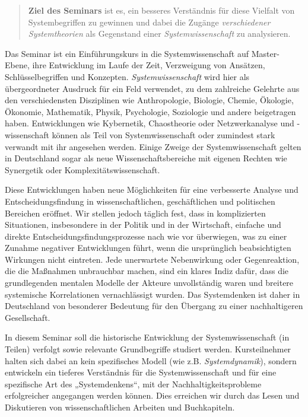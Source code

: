 \documentclass[11pt,a4paper]{article}
\begin{document}
\begin{quote}
  \textbf{Ziel des Seminars} ist es, ein besseres Verständnis für diese
  Vielfalt von Systembegriffen zu gewinnen und dabei die Zugänge
  \emph{verschiedener Systemtheorien} als Gegenstand einer
  \emph{Systemwissenschaft} zu analysieren.
\end{quote}
Das Seminar ist ein Einführungskurs in die Systemwissenschaft auf
Master-Ebene, ihre Entwicklung im Laufe der Zeit, Verzweigung von Ansätzen,
Schlüsselbegriffen und Konzepten.  \emph{Systemwissenschaft} wird hier als
übergeordneter Ausdruck für ein Feld verwendet, zu dem zahlreiche Gelehrte aus
den verschiedensten Disziplinen wie Anthropologie, Biologie, Chemie, Ökologie,
Ökonomie, Mathematik, Physik, Psychologie, Soziologie und andere beigetragen
haben. Entwicklungen wie Kybernetik, Chaostheorie oder Netzwerkanalyse und
-wissenschaft können als Teil von Systemwissenschaft oder zumindest stark
verwandt mit ihr angesehen werden.  Einige Zweige der Systemwissenschaft
gelten in Deutschland sogar als neue Wissenschaftsbereiche mit eigenen Rechten
wie Synergetik oder Komplexitätswissenschaft.

Diese Entwicklungen haben neue Möglichkeiten für eine verbesserte Analyse und
Entscheidungsfindung in wissenschaftlichen, geschäftlichen und politischen
Bereichen eröffnet. Wir stellen jedoch täglich fest, dass in komplizierten
Situationen, insbesondere in der Politik und in der Wirtschaft, einfache und
direkte Entscheidungsfindungsprozesse nach wie vor überwiegen, was zu einer
Zunahme negativer Entwicklungen führt, wenn die ursprünglich beabsichtigten
Wirkungen nicht eintreten. Jede unerwartete Nebenwirkung oder Gegenreaktion,
die die Maßnahmen unbrauchbar machen, sind ein klares Indiz dafür, dass die
grundlegenden mentalen Modelle der Akteure unvollständig waren und breitere
systemische Korrelationen vernachlässigt wurden. Das Systemdenken ist daher in
Deutschland von besonderer Bedeutung für den Übergang zu einer nachhaltigeren
Gesellschaft.

In diesem Seminar soll die historische Entwicklung der Systemwissenschaft (in
Teilen) verfolgt sowie relevante Grundbegriffe studiert werden. Kursteilnehmer
halten sich dabei an kein spezifisches Modell (wie z.B. \emph{Systemdynamik}),
sondern entwickeln ein tieferes Verständnis für die Systemwissenschaft und für
eine spezifische Art des „Systemdenkens“, mit der Nachhaltigkeitsprobleme
erfolgreicher angegangen werden können. Dies erreichen wir durch das Lesen und
Diskutieren von wissenschaftlichen Arbeiten und Buchkapiteln.
\end{document}
